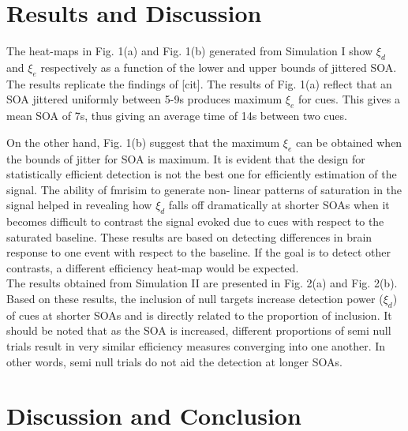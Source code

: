 \documentclass[11pt]{article}
\begin{document}
\section{Results and Discussion}

The heat-maps in Fig. 1(a) and Fig. 1(b) generated from Simulation I show $\xi_d$ and $\xi_e$ respectively as a function of the lower and upper bounds of jittered SOA. The results replicate the findings of [cit]. The results of Fig. 1(a) reflect that an SOA jittered uniformly between 5-9s produces maximum $\xi_e$ for cues. This gives a mean SOA of 7s, thus giving an average time of 14s between two cues.\par
On the other hand, Fig. 1(b) suggest that the maximum $\xi_e$ can be obtained when the bounds of jitter for SOA is maximum. It is evident that the design for statistically efficient detection is not the best one for efficiently estimation of the signal. The ability of fmrisim to generate non- linear patterns of saturation in the signal helped in revealing how $\xi_d$ falls off dramatically at shorter SOAs when it becomes difficult to contrast the signal evoked due to cues with respect to the saturated baseline. These results are based on detecting differences in brain response to one event with respect to the baseline. If the goal is to detect other contrasts, a different efficiency heat-map would be expected.\\

The results obtained from Simulation II are presented in Fig. 2(a) and Fig. 2(b). Based on these results, the inclusion of null targets increase detection power ($\xi_d$) of cues at shorter SOAs and is directly related to the proportion of inclusion. It should be noted that as the SOA is increased, different proportions of semi null trials result in very similar efficiency measures converging into one another. In other words, semi null trials do not aid the detection at longer SOAs.\par
\section{Discussion and Conclusion}


\medskip

 
\end{document}
